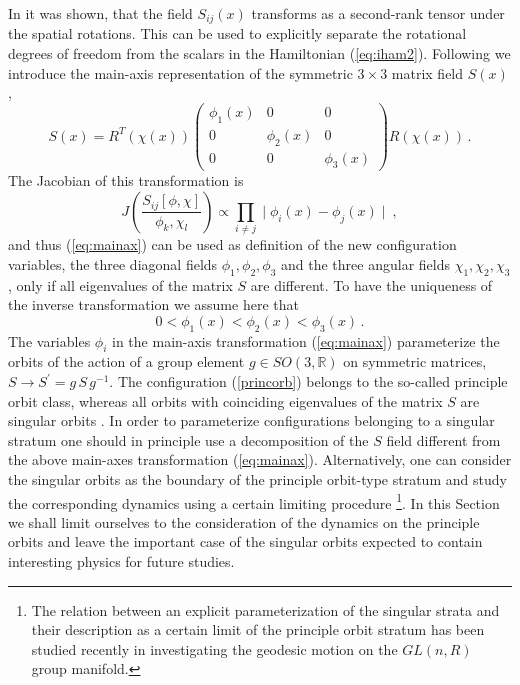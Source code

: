 \documentclass[a4paper,12pt]{article}
\newcommand{\sot}{SO(3, \mathbb{R})}
\begin{document}
In \cite{KP} it was shown, that the field $S_{ij}(x)$
transforms as a second-rank tensor under the spatial rotations.
This can be used to explicitly separate the rotational degrees of
freedom from the scalars in the Hamiltonian (\ref{eq:iham2}).
Following \cite{KP} we introduce  the main-axis representation
of the  symmetric $3 \times 3$ matrix field $S(x)$,
\begin{equation}
\label{eq:mainax}
S (x) =
R^T(\chi(x))
\left(
\begin{array}{ccc}
\phi_1(x)  &   0         &    0       \\
0          & \phi_2(x)   &    0        \\
0          &   0         &   \phi_3(x)
\end{array}
\right )
R(\chi(x))\,.
\end{equation}
The Jacobian of this transformation is
\begin{equation}
J\left(\frac{S_{ij}[\phi, \chi]}{\phi_{k}, \chi_{l}}\right) \propto
\prod_{i\neq j}\mid \phi_i(x) - \phi_j(x) \mid~,
\end{equation}
and thus (\ref{eq:mainax}) can be used as definition of
the new configuration variables,
the three diagonal fields $\phi_1, \phi_2, \phi_3$ and
the three angular fields $\chi_1, \chi_2,\chi_3$,
only if all eigenvalues of the matrix $S$ are different.
To have the uniqueness of the inverse transformation we assume here
that
\begin{equation}
\label{princorb}
0 < \phi_1(x) < \phi_2(x) < \phi_3(x)\,.
\end{equation}
The variables $\phi_i$ in the main-axis transformation (\ref{eq:mainax})
parameterize the orbits of the action of a group element $g\in\sot$ on symmetric
matrices, $S\rightarrow S^\prime = g\, S\, g^{-1} $.
The configuration (\ref{princorb}) belongs to the so-called  principle orbit
class,
whereas all orbits with coinciding eigenvalues of the matrix $S$ are
singular orbits \cite{ORaf}.
In order to parameterize configurations belonging to a singular stratum
one should in principle use a decomposition of the $S$ field different from the
above main-axes transformation (\ref{eq:mainax}).
Alternatively, one can consider the singular orbits as the boundary of the
principle orbit-type stratum and study the corresponding dynamics using a
certain limiting procedure
\footnote{The relation between an explicit parameterization
of the singular strata and their description as a certain limit
of the principle orbit stratum has been studied recently in \cite{AD}
investigating the geodesic motion on the $GL(n, R)$ group manifold.}.
In this Section we shall limit ourselves to the consideration of the dynamics
on the principle orbits and leave the important case of the singular orbits
expected to contain interesting physics for future studies.
\end{document}
